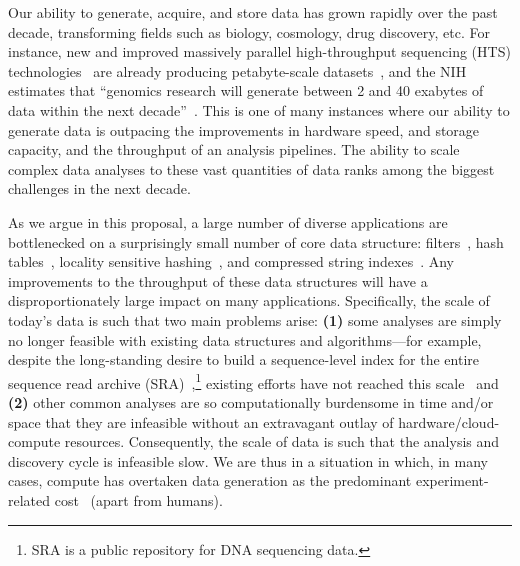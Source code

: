 Our ability to generate, acquire, and store data has grown rapidly over
the past decade, transforming fields such as biology, cosmology, drug
discovery, etc.   
For
instance, new and improved
massively parallel high-throughput sequencing (HTS) technologies~\cite{reuter2015high} are already producing petabyte-scale
datasets~\cite{kodama2012sequence}, and the NIH estimates that ``genomics
research will generate between 2 and 40 exabytes of data within the next
decade''~\cite{NHGRIDataScience}.
This is one of many instances where our
ability to generate data is outpacing the improvements in hardware speed, and
storage capacity, and the throughput of an analysis pipelines.
The ability to scale complex data analyses to these vast quantities of data ranks among the biggest challenges in the next decade.

As we argue in this proposal, a large number of diverse applications are bottlenecked on a surprisingly small number of core data structure: filters~\cite{PandeyAlBe18, solomon2016fast},
hash tables~\cite{solomon2016fast,almodaresi2022incrementally}, locality
sensitive hashing~\cite{Marais2019}, and compressed string
indexes~\cite{Almodaresi2018Pufferfish}. 
Any improvements to the throughput of these data structures will have a disproportionately large impact on many applications. 
Specifically, the scale of today's data is
such that two main problems arise: \textbf{(1)} some analyses are simply
no longer feasible with existing data structures and algorithms---for example,
despite the long-standing desire to build a sequence-level index for the entire
sequence read archive (SRA)~\cite{SRA},\footnote{SRA is a public repository for DNA sequencing data.} existing efforts have not reached this
scale~\cite{Karasikov2020, HarrisM20, SolomonK17, almodaresi2022incrementally,
AlmodaresiPFJP20,PandeyAlBe18} and \textbf{(2)} other common analyses are so computationally burdensome in time and/or space that they are infeasible without an extravagant outlay of hardware/cloud-compute resources.
Consequently, the scale of data is such that the analysis and discovery cycle is infeasible slow.  We are thus in a situation in
which, in many cases, compute has overtaken data generation as the predominant
experiment-related cost~\cite{Muir_2016} (apart from humans).

